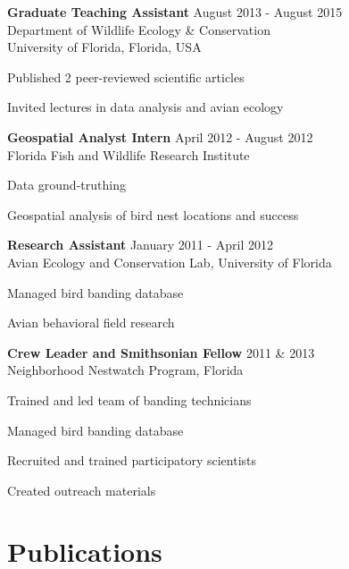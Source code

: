 \documentclass[11pt,]{article}
\providecommand{\tightlist}{%
  \setlength{\itemsep}{0pt}\setlength{\parskip}{0pt}}
\renewenvironment{itemize}{
 \begin{list}{- }{
   \setlength{\leftmargin}{1.5em}
   \setlength{\itemsep}{0pt}
 }
}{
 \end{list}
}
\begin{document}
\textbf{Graduate Teaching Assistant} \hfill August 2013 - August 2015\\
Department of Wildlife Ecology \& Conservation\\
University of Florida, Florida, USA

\begin{itemize}
\tightlist
\item
  Published 2 peer-reviewed scientific articles
\item
  Invited lectures in data analysis and avian ecology
\end{itemize}

\textbf{Geospatial Analyst Intern} \hfill April 2012 - August 2012\\
Florida Fish and Wildlife Research Institute

\begin{itemize}
\tightlist
\item
  Data ground-truthing
\item
  Geospatial analysis of bird nest locations and success 
\end{itemize}

\textbf{Research Assistant} \hfill January 2011 - April 2012\\
Avian Ecology and Conservation Lab, University of Florida

\begin{itemize}
\tightlist
\item
  Managed bird banding database
\item
  Avian behavioral field research
\end{itemize}

\textbf{Crew Leader and Smithsonian Fellow} \hfill 2011 \& 2013\\
Neighborhood Nestwatch Program, Florida

\begin{itemize}
\tightlist
\item
  Trained and led team of banding technicians
\item
  Managed bird banding database
\item
  Recruited and trained participatory scientists
\item
  Created outreach materials
\end{itemize}

\hypertarget{publications}{%
\section{Publications}\label{publications}}
\end{document}
